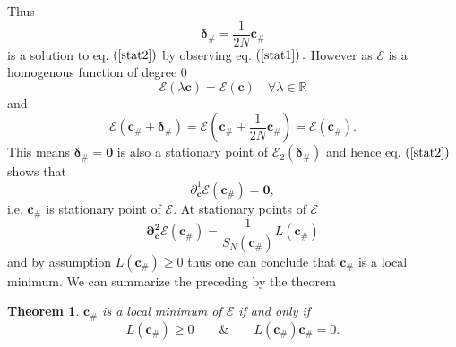 \documentclass[aps,preprint]{revtex4}%
\newtheorem{theorem}{Theorem}
\begin{document}
Thus
\begin{equation}
\mathbf{\delta}_{\#}=\frac{1}{2N}\mathbf{c}_{\#}%
\end{equation}
is a solution to eq. $\left(  \ref{stat2}\right)  $ by observing eq. $\left(
\ref{stat1}\right)  .$ However as $\mathcal{E}$ is a homogenous function of
degree $0$
\begin{equation}
\mathcal{E}\left(  \lambda\mathbf{c}\right)  =\mathcal{E}\left(
\mathbf{c}\right)  \quad\forall\lambda\in\mathbb{R}%
\end{equation}
and
\begin{equation}
\mathcal{E}\left(  \mathbf{c}_{\#}+\mathbf{\delta}_{\#}\right)  =\mathcal{E}%
\left(  \mathbf{c}_{\#}+\frac{1}{2N}\mathbf{c}_{\#}\right)  =\mathcal{E}%
\left(  \mathbf{c}_{\#}\right)  .
\end{equation}
This means $\mathbf{\delta}_{\#}=\mathbf{0}$ is also a stationary point of
$\mathcal{E}_{2}\left(  \mathbf{\delta}_{\#}\right)  $ and hence eq. $\left(
\ref{stat2}\right)  $ shows that
\begin{equation}
\partial_{\mathbf{c}}^{1}\mathcal{E}\left(  \mathbf{c}_{\#}\right)
=\mathbf{0,}%
\end{equation}
i.e. $\mathbf{c}_{\#}$ is stationary point of $\mathcal{E}.$ At stationary
points of $\mathcal{E}$
\begin{equation}
\mathbf{\partial_{\mathbf{c}}^{2}\mathcal{E}\left(  \mathbf{c}_{\#}\right)
=}\frac{1}{S_{N}\left(  \mathbf{c}_{\#}\right)  }L\left(  \mathbf{c}%
_{\#}\right)
\end{equation}
and by assumption $L\left(  \mathbf{c}_{\#}\right)  \geq0$ thus one can
conclude that $\mathbf{c}_{\#}$ is a local minimum. We can summarize the
preceding by the theorem

\begin{theorem}
$\mathbf{c}_{\#}$ is a local minimum of $\mathcal{E}$ if and only if
\begin{equation}
L\left(  \mathbf{c}_{\#}\right)  \geq0\qquad\&\qquad L\left(  \mathbf{c}%
_{\#}\right)  \mathbf{c}_{\#}=0.
\end{equation}

\end{theorem}
\end{document}
